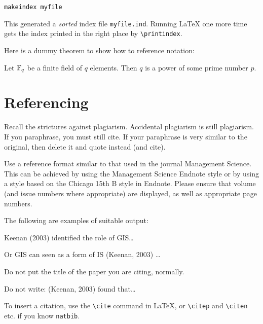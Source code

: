\texttt{makeindex myfile}

This generated a \emph{sorted} index file \texttt{myfile.ind}.  Running LaTeX one more time gets the index printed
in the right place by \verb|\printindex|.

Here is a dummy theorem to show how to reference notation:
\begin{thm}\label{Th.FF.fte.field}
Let $\mathbb{F}_q$ be a finite field of $q$ elements.  Then $q$ is a power of some prime number $p$.
\end{thm}


\section{Referencing}

Recall the strictures against plagiarism. Accidental plagiarism is still plagiarism. If you paraphrase, you must still cite. If your paraphrase is very similar to the original, then delete it and quote instead (and cite).

Use a reference format similar to that used in the journal Management Science. This can be achieved by using the Management Science Endnote style or by using a style based on the Chicago 15th B style in Endnote.  Please ensure that volume (and issue numbers where appropriate) are displayed, as well as appropriate page numbers.

The following are examples of suitable output:

Keenan (2003) identified the role of GIS\ldots

Or GIS can seen as a form of IS (Keenan, 2003) \dots

Do not put the title of the paper you are citing, normally.

Do not write: (Keenan, 2003) found that\ldots

To insert a citation, use the \verb+\cite+ command in LaTeX, or \verb+\citep+ and \verb+\citen+ etc. if you know \verb+natbib+.
